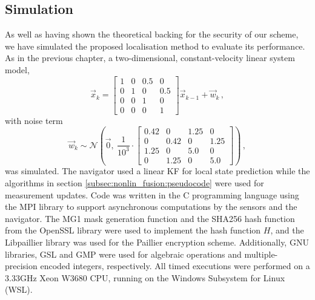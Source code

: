 \subsection{Simulation}\label{subsec:nonlin_fusion:simulation}
As well as having shown the theoretical backing for the security of our scheme, we have simulated the proposed localisation method to evaluate its performance. As in the previous chapter, a two-dimensional, constant-velocity linear system model,
\begin{equation}\label{eq:nonlin_fusion:simulation_system_model}
    \vec{x}_{k} = 
    \begin{bmatrix}
        1 & 0 & 0.5 & 0\\
        0 & 1 & 0   & 0.5\\
        0 & 0 & 1   & 0\\
        0 & 0 & 0   & 1
    \end{bmatrix}\vec{x}_{k-1} + \vec{w}_k\,,
\end{equation}
with noise term
\begin{equation}
    \vec{w}_k\sim\mathcal{N}\left(\vec{0},\ \frac{1}{10^{3}}\cdot
    \begin{bmatrix}
        0.42 & 0    & 1.25 & 0\\
        0    & 0.42 & 0    & 1.25\\
        1.25 & 0    & 5.0  & 0\\
        0    & 1.25 & 0    & 5.0
    \end{bmatrix}
    \right)\,,
\end{equation}
was simulated. The navigator used a linear KF for local state prediction while the algorithms in section \ref{subsec:nonlin_fusion:pseudocode} were used for measurement updates. Code was written in the C programming language using the MPI library \cite{theopenmpiprojectOpenMPI2020} to support asynchronous computations by the sensors and the navigator. The MG1 mask generation function and the SHA256 hash function from the OpenSSL library \cite{theopensslprojectOpenSSL2020} were used to implement the hash function $H$, and the Libpaillier library \cite{bethencourtLibpaillier2010} was used for the Paillier encryption scheme. Additionally, GNU libraries, GSL \cite{thegsldevelopmentteamGSLGNUScientific2019} and GMP \cite{granlundGMPGNUMultiple2020} were used for algebraic operations and multiple-precision encoded integers, respectively. All timed executions were performed on a 3.33GHz Xeon W3680 CPU, running on the Windows Subsystem for Linux (WSL).


